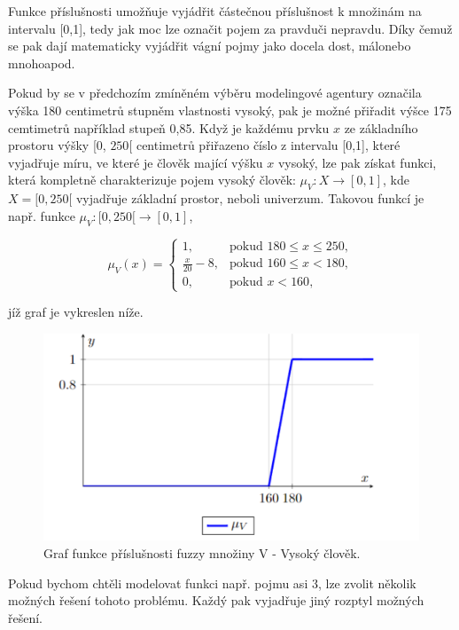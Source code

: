     Funkce příslušnosti umož\v nuje vyjádřit částečnou příslušnost k množinám na intervalu [0,1], tedy jak moc lze označit pojem za \clqq pravdu\crqq \space či \clqq nepravdu\crqq. Díky čemuž se pak dají matematicky vyjádřit vágní pojmy jako \clqq docela dost\crqq, \clqq málo\crqq \space nebo \clqq mnoho\crqq \space apod.

     Pokud by se v předchozím zmíněném výběru modelingové agentury označila výška 180 centimetr\r u stupněm vlastnosti \clqq vysoký\crqq {}, pak je možné přiřadit výšce 175 cemtimetr\r u například stupe\v n 0,85. Když je každému prvku $x$ ze základního prostoru výšky [0, $250$[ centimetr\r u přiřazeno číslo z intervalu [0,1], které vyjadřuje míru, ve které je člověk mající výšku $x$ vysoký, lze pak získat funkci, která kompletně charakterizuje pojem vysoký člověk: $\mu_V: X \to [0,1]$, kde $X = [0, 250[$ vyjadřuje základní prostor, neboli univerzum. Takovou funkcí je např. funkce $\mu_V:  [0, 250[ \rightarrow [0,1]$, 

    $$\mu_V(x)=\begin{cases} 1, & \mbox{pokud }  180\leq x \leq 250,\\ 
    \frac{x}{20} - 8, & \mbox{pokud } 160 \leq x < 180,\\
    0, & \mbox{pokud } x < 160,  \end{cases}$$

    jíž graf je vykreslen níže.

\begin{figure}[h]
    \caption{ Graf funkce příslušnosti fuzzy množiny V - \clqq Vysoký člověk\crqq.}
        \includegraphics[scale=0.65]{template-fig/vysoky_clovek.pdf}
        \centering
\end{figure}    



Pokud bychom chtěli modelovat funkci např. pojmu \clqq asi 3\crqq, lze zvolit několik možných řešení tohoto problému. Každý pak vyjadřuje jiný rozptyl možných řešení.
 
